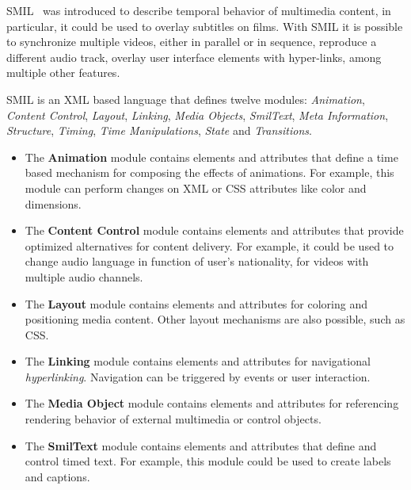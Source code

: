 \documentclass[10pt,conference]{IEEEtran}
\begin{document}
  \gls{SMIL}~\cite{smil} was introduced to describe temporal behavior of multimedia content, in particular, it could be used to overlay subtitles on films. With \gls{SMIL} it is possible to synchronize multiple videos, either in parallel or in sequence, reproduce a different audio track, overlay user interface elements with hyper-links, among multiple other features.

  \gls{SMIL} is an \gls{XML} based language that defines twelve modules: \emph{Animation}, \emph{Content Control}, \emph{Layout}, \emph{Linking}, \emph{Media Objects}, \emph{SmilText}, \emph{Meta Information}, \emph{Structure}, \emph{Timing}, \emph{Time Manipulations}, \emph{State} and \emph{Transitions}.


\begin{itemize}

  \item The \textbf{Animation} module contains elements and attributes that define a time based mechanism for composing the effects of animations. For example, this module can perform changes on \gls{XML} or \gls{CSS} attributes like color and dimensions.  

  \item The \textbf{Content Control} module contains elements and attributes that provide optimized alternatives for content delivery. For example, it could be used to change audio language in function of user's nationality, for videos with multiple audio channels.

  \item The \textbf{Layout} module contains elements and attributes for coloring and positioning media content. Other layout mechanisms are also possible, such as \gls{CSS}.

  \item The \textbf{Linking} module contains elements and attributes for navigational \emph{hyperlinking}. Navigation can be triggered by events or user interaction.

  \item The \textbf{Media Object} module contains elements and attributes for referencing rendering behavior of external multimedia or control objects.

  \item The \textbf{SmilText} module contains elements and attributes that define and control timed text. For example, this module could be used to create labels and captions.


\end{itemize}
\end{document}
